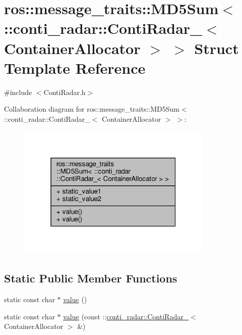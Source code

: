\hypertarget{structros_1_1message__traits_1_1MD5Sum_3_01_1_1conti__radar_1_1ContiRadar___3_01ContainerAllocator_01_4_01_4}{}\section{ros\+:\+:message\+\_\+traits\+:\+:M\+D5\+Sum$<$ \+:\+:conti\+\_\+radar\+:\+:Conti\+Radar\+\_\+$<$ Container\+Allocator $>$ $>$ Struct Template Reference}
\label{structros_1_1message__traits_1_1MD5Sum_3_01_1_1conti__radar_1_1ContiRadar___3_01ContainerAllocator_01_4_01_4}


{\ttfamily \#include $<$Conti\+Radar.\+h$>$}



Collaboration diagram for ros\+:\+:message\+\_\+traits\+:\+:M\+D5\+Sum$<$ \+:\+:conti\+\_\+radar\+:\+:Conti\+Radar\+\_\+$<$ Container\+Allocator $>$ $>$\+:\nopagebreak
\begin{figure}[H]
\begin{center}
\leavevmode
\includegraphics[width=265pt]{d3/d35/structros_1_1message__traits_1_1MD5Sum_3_01_1_1conti__radar_1_1ContiRadar___3_01ContainerAllocator_01_4_01_4__coll__graph}
\end{center}
\end{figure}
\subsection*{Static Public Member Functions}
\begin{DoxyCompactItemize}
\item 
static const char $\ast$ \hyperlink{structros_1_1message__traits_1_1MD5Sum_3_01_1_1conti__radar_1_1ContiRadar___3_01ContainerAllocator_01_4_01_4_a77147d9f7af8df77e4fd0ca2f38fddf6}{value} ()
\item 
static const char $\ast$ \hyperlink{structros_1_1message__traits_1_1MD5Sum_3_01_1_1conti__radar_1_1ContiRadar___3_01ContainerAllocator_01_4_01_4_afab7e416de070fd3b9b1459e90699282}{value} (const \+::\hyperlink{structconti__radar_1_1ContiRadar__}{conti\+\_\+radar\+::\+Conti\+Radar\+\_\+}$<$ Container\+Allocator $>$ \&)
\end{DoxyCompactItemize}
